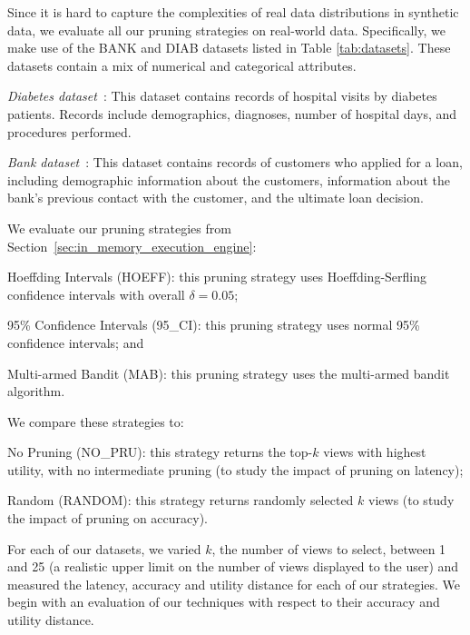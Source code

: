  Since it is hard to capture the complexities of real data distributions in synthetic data, we
evaluate all our pruning strategies on real-world data. 
Specifically, we make use of the BANK and DIAB datasets listed in Table
\ref{tab:datasets}. These datasets
contain a mix of numerical and categorical attributes.
\begin{denselist}
\item {\it Diabetes dataset}~\cite{diab}: This dataset contains records of hospital
visits by diabetes patients. Records include demographics,
diagnoses, number of hospital days, and procedures performed. 
\item {\it Bank dataset}~\cite{bank}: This dataset contains records of customers who
applied for a loan, including demographic information about the
customers, information about the bank's previous contact with the customer, and
the ultimate loan decision.
\end{denselist}
 We evaluate our pruning strategies from Section~\ref{sec:in_memory_execution_engine}:
\begin{compactenum}[(a)]
 \item Hoeffding Intervals (HOEFF): this pruning strategy uses Hoeffding-Serfling
 confidence intervals with overall $\delta = 0.05$; 
 \item 95\% Confidence Intervals (95\_CI): this pruning strategy uses normal 95\% confidence intervals; and 
\item Multi-armed Bandit (MAB): this pruning strategy uses the multi-armed bandit algorithm.
\end{compactenum}
We compare these strategies to:
\begin{compactenum}[(a)]
\item No Pruning (NO\_PRU): this strategy returns the top-$k$ views with highest utility,
with no intermediate pruning (to study the impact of pruning on latency);
\item Random (RANDOM): this strategy returns randomly selected $k$ views (to study the impact of pruning on accuracy).
\end{compactenum}
For each of our datasets, we varied $k$, the number of views to select, between
1 and 25 (a realistic upper limit on the number of views displayed to the user)
and measured the latency, accuracy and utility distance for each of our
strategies. We begin with an evaluation of our techniques with respect to their accuracy
and utility distance.

